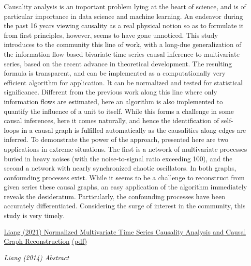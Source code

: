 \documentclass[
]{book}
\begin{document}
Causality analysis is an important problem lying at the heart of science, and is of particular
importance in data science and machine learning. An endeavor during the past 16 years viewing
causality as a real physical notion so as to formulate it from first principles, however, seems to
have gone unnoticed. This study introduces to the community this line of work, with a long-due
generalization of the information flow-based bivariate time series causal inference to multivariate
series, based on the recent advance in theoretical development. The resulting formula is transparent,
and can be implemented as a computationally very efficient algorithm for application. It can be
normalized and tested for statistical significance. Different from the previous work along this line
where only information flows are estimated, here an algorithm is also implemented to quantify the
influence of a unit to itself. While this forms a challenge in some causal inferences, here it comes
naturally, and hence the identification of self-loops in a causal graph is fulfilled automatically as the
causalities along edges are inferred. To demonstrate the power of the approach, presented here are
two applications in extreme situations. The first is a network of multivariate processes buried in
heavy noises (with the noise-to-signal ratio exceeding 100), and the second a network with nearly
synchronized chaotic oscillators. In both graphs, confounding processes exist. While it seems to be a
challenge to reconstruct from given series these causal graphs, an easy application of the algorithm
immediately reveals the desideratum. Particularly, the confounding processes have been accurately
differentiated. Considering the surge of interest in the community, this study is very timely.

\href{https://www.mdpi.com/1099-4300/23/6/679}{Liang (2021) Normalized Multivariate Time Series Causality Analysis and Causal Graph Reconstruction}
\href{pdf/Liang_2021_Time_Series_Causality.pdf}{(pdf)}

\emph{Liang (2014) Abstract}
\end{document}
